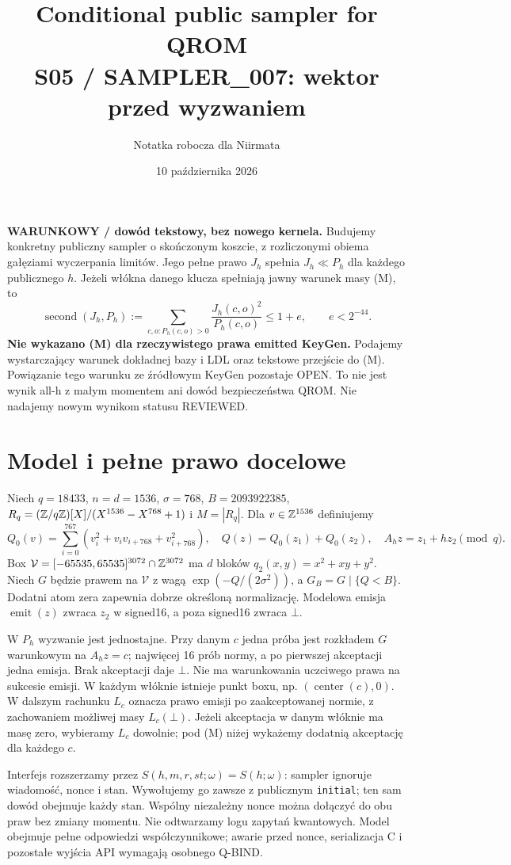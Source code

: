\documentclass[11pt,a4paper]{article}
\title{Conditional public sampler for QROM\\\large S05 / SAMPLER\_007: wektor przed wyzwaniem}
\author{Notatka robocza dla Niirmata}\date{10 października 2026}
\newcommand{\code}[1]{\nolinkurl{#1}}
\newcommand{\botr}{\bot}\newcommand{\Sec}{\operatorname{second}}
\begin{document}
\maketitle
\textbf{WARUNKOWY / dowód tekstowy, bez nowego kernela.}
Budujemy konkretny publiczny sampler o skończonym koszcie, z rozliczonymi
obiema gałęziami wyczerpania limitów. Jego pełne prawo $J_h$ spełnia
$J_h\ll P_h$ dla każdego publicznego $h$. Jeżeli włókna danego klucza
spełniają jawny warunek masy (M), to
\[
 \Sec(J_h,P_h):=\sum_{c,o:P_h(c,o)>0}\frac{J_h(c,o)^2}{P_h(c,o)}
 \le 1+e,\qquad e<2^{-44}.
\]
\textbf{Nie wykazano (M) dla rzeczywistego prawa emitted KeyGen.}
Podajemy wystarczający warunek dokładnej bazy i LDL oraz tekstowe przejście
do (M). Powiązanie tego warunku ze źródłowym KeyGen pozostaje OPEN.
To nie jest wynik all-h z małym momentem ani dowód bezpieczeństwa QROM.
Nie nadajemy nowym wynikom statusu REVIEWED.

\section{Model i pełne prawo docelowe}
Niech $q=18433$, $n=d=1536$, $\sigma=768$, $B=2093922385$,
$R_q=(\mathbb Z/q\mathbb Z)[X]/(X^{1536}-X^{768}+1)$ i $M=|R_q|$.
Dla $v\in\mathbb Z^{1536}$ definiujemy
\[
 Q_0(v)=\sum_{i=0}^{767}(v_i^2+v_iv_{i+768}+v_{i+768}^2),\quad
 Q(z)=Q_0(z_1)+Q_0(z_2),\quad A_hz=z_1+hz_2\pmod q.
\]
Box $\mathcal V=[-65535,65535]^{3072}\cap\mathbb Z^{3072}$ ma $d$ bloków
$q_2(x,y)=x^2+xy+y^2$. Niech $G$ będzie prawem na $\mathcal V$
z wagą $\exp(-Q/(2\sigma^2))$, a $G_B=G\mid\{Q<B\}$.
Dodatni atom zera zapewnia dobrze określoną normalizację.
Modelowa emisja $\operatorname{emit}(z)$ zwraca $z_2$ w signed16,
a poza signed16 zwraca $\botr$.

W $P_h$ wyzwanie jest jednostajne. Przy danym $c$ jedna próba jest
rozkładem $G$ warunkowym na $A_hz=c$; najwięcej 16 prób normy,
a po pierwszej akceptacji jedna emisja. Brak akceptacji daje $\botr$.
Nie ma warunkowania uczciwego prawa na sukcesie emisji.
W każdym włóknie istnieje punkt boxu, np. $(\operatorname{center}(c),0)$.
W dalszym rachunku $L_c$ oznacza prawo emisji po zaakceptowanej normie,
z zachowaniem możliwej masy $L_c(\botr)$. Jeżeli akceptacja w danym
włóknie ma masę zero, wybieramy $L_c$ dowolnie; pod (M) niżej wykażemy
dodatnią akceptację dla każdego $c$.

Interfejs rozszerzamy przez $S(h,m,r,st;\omega)=S(h;\omega)$: sampler ignoruje
wiadomość, nonce i stan. Wywołujemy go zawsze z publicznym
\code{initial}; ten sam dowód obejmuje każdy stan. Wspólny niezależny nonce
można dołączyć do obu praw bez zmiany momentu. Nie odtwarzamy logu zapytań
kwantowych. Model obejmuje pełne odpowiedzi współczynnikowe; awarie przed
nonce, serializacja C i pozostałe wyjścia API wymagają osobnego Q-BIND.
\end{document}
